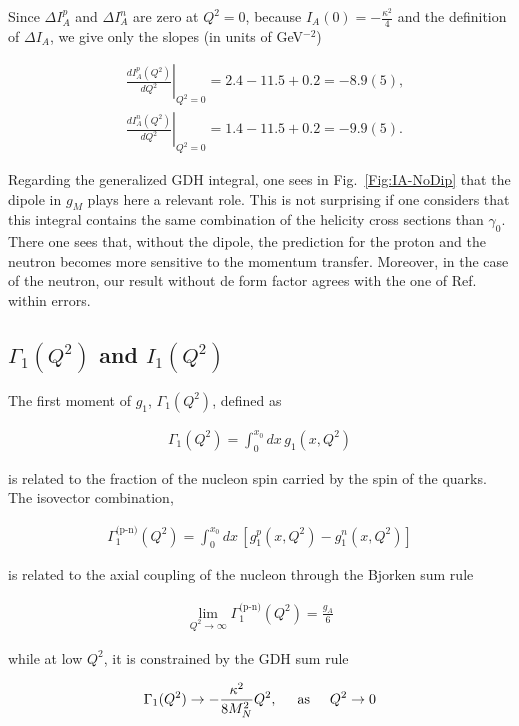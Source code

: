 \documentclass[prc,twocolumn,showpacs,preprintnumbers,amsmath,amssymb
,superscriptaddress,a4paper,nofootinbib
]{revtex4-1}
\begin{document}
Since $\Delta I_A^p$ and $\Delta I_A^n$ are zero at $Q^2=0$, because $I_A (0) = - \frac{\kappa^2}{4}$ and the definition of $\Delta I_A$, we give only the slopes (in units of GeV$^{-2}$)

\begin{align}
&\left.\frac{dI_A^p (Q^2)}{dQ^2}\right|_{Q^2=0}= 2.4 -11.5 + 0.2  = -8.9(5),\\
&\left.\frac{dI_A^n (Q^2)}{dQ^2}\right|_{Q^2=0}=  1.4 -11.5 + 0.2  =  - 9.9(5).
\end{align}

Regarding the generalized GDH integral, one sees in Fig.~\ref{Fig:IA-NoDip} that the dipole in $g_M$ plays here a relevant role. 
This is not surprising if one considers that this integral contains the same combination of the helicity cross sections than $\gamma_0$. 
There one sees that, without the dipole, the prediction for the proton and the neutron becomes more sensitive to the momentum transfer.
Moreover, in the case of the neutron, our result without de form factor agrees with the one of Ref.~\cite{Bernard:2012hb} within errors.



\subsection{ $\Gamma_1(Q^2)$ and $I_1(Q^2)$} 

The first moment of $g_1$, $\Gamma_1 (Q^2)$, defined as

\begin{align}
 \Gamma_1(Q^2) = \int^{x_0}_0\!\! dx\, g_1(x,Q^2) 
\end{align}


 is related to the fraction of the nucleon spin carried by the spin of the quarks. 
 The isovector combination,
 
\begin{align}
 \Gamma^{\text{(p-n)}}_1(Q^2) = \int^{x_0}_0\!\! dx\, [g^p_1(x,Q^2) - g^n_1(x,Q^2) ] 
\end{align}
 
 is related to the axial coupling of the nucleon through the Bjorken sum rule \cite{Bjorken:1966jh,Bjorken:1969mm}
 
\begin{align}
\lim_{Q^2 \to \infty} \Gamma^{\text{(p-n)}}_1(Q^2) = \frac{g_A}{6}
\end{align}

while at low $Q^2$, it is constrained by the GDH sum rule

\begin{align}
 \Gamma_1(Q^2) \to - \frac{\kappa^2}{8 M_N^2} Q^2, \text{\hspace{0.5cm}as\hspace{0.5cm}} Q^2 \to 0
\end{align}
\end{document}
